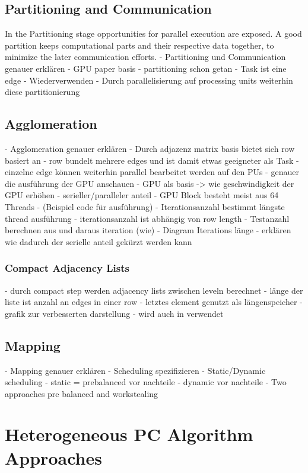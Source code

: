 \subsection{Partitioning and Communication}
In the Partitioning stage opportunities for parallel execution are exposed. A good partition keeps computational parts and their respective data together, to minimize the later communication efforts. 
- Partitioning und Communication genauer erklären
- GPU paper basis
    - partitioning schon getan
    - Task ist eine edge
    - Wiederverwenden
    - Durch parallelisierung auf processing units weiterhin diese partitionierung
    
\subsection{Agglomeration}
- Agglomeration genauer erklären
- Durch adjazenz matrix basis bietet sich row basiert an
- row bundelt mehrere edges und ist damit etwas geeigneter als Task
- einzelne edge können weiterhin parallel bearbeitet werden auf den PUs
- genauer die ausführung der GPU anschauen
 - GPU als basis -> wie geschwindigkeit der GPU erhöhen
 - serieller/paralleler anteil
 - GPU Block besteht meist aus 64 Threads
 - (Beispiel code für ausführung)
 - Iterationsanzahl bestimmt längste thread ausführung
 - iterationsanzahl ist abhängig von row length
 - Testanzahl berechnen aus und daraus iteration (wie)
 - Diagram Iterations länge
 - erklären wie dadurch der serielle anteil gekürzt werden kann
 
\subsubsection{Compact Adjacency Lists}
- durch compact step werden adjacency lists zwischen leveln berechnet
- länge der liste ist anzahl an edges in einer row
- letztes element genutzt als längenspeicher
- grafik zur verbesserten darstellung
- wird auch in \cite{zarebavani_cupc_2018} verwendet

\subsection{Mapping}
- Mapping genauer erklären
- Scheduling spezifizieren
    - Static/Dynamic scheduling
    - static = prebalanced
        vor nachteile
    - dynamic 
        vor nachteile
- Two approaches pre balanced and workstealing

\section{Heterogeneous PC Algorithm Approaches}
